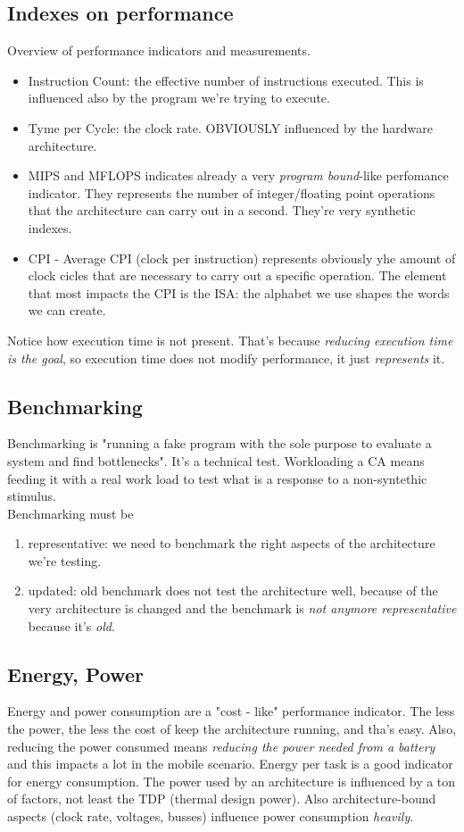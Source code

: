 \documentclass[10pt,a4paper]{article}
\begin{document}
			\subsection{Indexes on performance}
				Overview of performance indicators and measurements.
				\begin{itemize}
					\item Instruction Count: the effective number of instructions executed. This is influenced also by the program we're trying to execute.
					\item Tyme per Cycle: the clock rate. OBVIOUSLY influenced by the hardware architecture.
					\item MIPS and MFLOPS indicates already a very \emph{program bound}-like perfomance indicator. They represents the number of integer/floating point operations that the architecture can carry out in a second. They're very synthetic indexes.
					\item CPI - Average CPI (clock per instruction) represents obviously yhe amount of clock cicles that are necessary to carry out a specific operation. The element that most impacts the CPI is the ISA: the alphabet we use shapes the words we can create. 
				\end{itemize}
				Notice how execution time is not present. That's because \emph{reducing execution time is the goal}, so execution time does not modify performance, it just \emph{represents} it. 
			
			\subsection{Benchmarking}
				Benchmarking is "running a fake program with the sole purpose to evaluate a system and find bottlenecks". It's a technical test. Workloading a CA means feeding it with a real work load to test what is a response to a non-syntethic stimulus.\\
				Benchmarking must be
				\begin{enumerate}
					\item representative: we need to benchmark the right aspects of the architecture we're testing.
					\item updated: old benchmark does not test the architecture well, because of the very architecture is changed and the benchmark is \emph{not anymore representative} because it's \emph{old}.
				\end{enumerate}
			
			\subsection{Energy, Power}
				Energy and power consumption are a "cost - like" performance indicator. The less the power, the less the cost of keep the architecture running, and tha's easy. Also, reducing the power consumed means \emph{reducing the power needed from a battery} and this impacts a lot in the mobile scenario. Energy per task is a good indicator for energy consumption. The power used by an architecture is influenced by a ton of factors, not least the TDP (thermal design power). Also architecture-bound aspects (clock rate, voltages, busses) influence power consumption \emph{heavily}.
\end{document}
